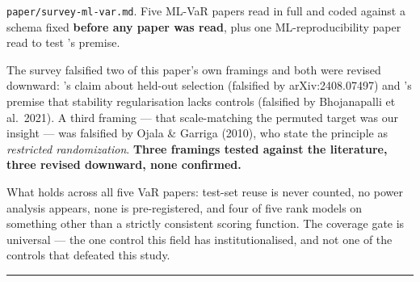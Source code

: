 \texttt{paper/survey-ml-var.md}. Five ML-VaR papers read in full and coded against a schema fixed
\textbf{before any paper was read}, plus one ML-reproducibility paper read to test 's premise.

The survey falsified two of this paper's own framings and both were revised downward: 's claim
about held-out selection (falsified by arXiv:2408.07497) and 's premise that stability
regularisation lacks controls (falsified by Bhojanapalli et al.~2021). A third framing --- that
scale-matching the permuted target was our insight --- was falsified by Ojala \& Garriga (2010),
who state the principle as \emph{restricted randomization}. \textbf{Three framings tested against the
literature, three revised downward, none confirmed.}

What holds across all five VaR papers: test-set reuse is never counted, no power analysis
appears, none is pre-registered, and four of five rank models on something other than a strictly
consistent scoring function. The coverage gate is universal --- the one control this field has
institutionalised, and not one of the controls that defeated this study.

\begin{center}\rule{0.5\linewidth}{0.5pt}\end{center}
